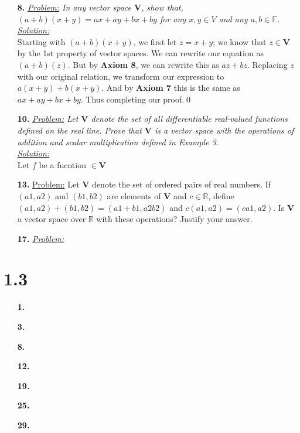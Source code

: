 \documentclass[11pt, fleqn]{article}
\newcommand{\vectSpace}[0]{\mathbf{V}}
\begin{document}
\begin{itemize}
    
    \item [\textbf{8.}]
    \textit{\underline{Problem:} In any vector space $\mathbf{V}$, show that, $(a + b)(x + y) = ax + ay + bx + by$ for any $x,y \in V$ and any $a,b \in \mathbb{F}$.}\\[2ex]\textit{\underline{Solution:}}\\
        Starting with $(a + b)(x + y)$, we first let $z = x + y$; we know that $z\in\vectSpace$ by the 1st property of vector spaces. We can rewrite our equation as $(a + b)(z)$. But by \textbf{Axiom 8}, we can rewrite this as $az + bz$. Replacing $z$ with our original relation, we transform our expression to $a(x+y) + b(x+y)$. And by \textbf{Axiom 7} this is the same as $ax + ay + bx + by$. Thus completing our proof.\qed
    
    \item [\textbf{10.}]
    \textit{\underline{Problem:} Let $\mathbf{V}$ denote the set of all differentiable real-valued functions defined on the real line. Prove that $\mathbf{V}$ is a vector space with the operations of addition and scalar multiplication defined in Example 3.}\\[2ex]\textit{\underline{Solution:}}\\
        Let $f$ be a fucntion $\in\mathbf{V}$
        
    
    \item [\textbf{13.}]
    {\underline{Problem:} Let $\mathbf{V}$ denote the set of ordered pairs of real numbers. If $(a1,a2)$ and $(b1, b2)$ are elements of $\mathbf{V}$ and $c \in \mathbb{R}$, define $(a1, a2) + (b1,b2) = (a1 + b1, a2b2)$ and $c(a1,a2) = (ca1,a2)$. Is $\mathbf{V}$ a vector space over $\mathbb{R}$ with these operations? Justify your answer.}
    
    \item [\textbf{17.}]
    \textit{\underline{Problem:} }
\end{itemize}

\section*{1.3}
\begin{itemize}
    \setlength\itemsep{5ex}
    \item [\textbf{1.}]
    \item [\textbf{3.}]
    \item [\textbf{8.}]
    \item [\textbf{12.}]
    \item [\textbf{19.}]
    \item [\textbf{25.}]
    \item [\textbf{29.}]
\end{itemize}
\end{document}
